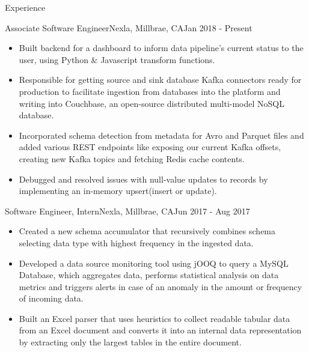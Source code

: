\documentclass[]{dhruv_misra}
\begin{document}
	\makeheader
	
	
	\begin{cvsection}{Experience}
        \begin{cvsubsection}{Associate Software Engineer}{Nexla, Millbrae, CA}{Jan 2018 - Present}
			\begin{itemize}
				\item Built backend for a dashboard to inform data pipeline's current status to the user, using Python \& Javascript transform functions.
				\item Responsible for getting source and sink database Kafka connectors ready for production to facilitate ingestion from databases into the platform and writing into Couchbase, an open-source distributed multi-model NoSQL database.
				\item Incorporated schema detection from metadata for Avro and Parquet files and added various REST endpoints like exposing our current Kafka offsets, creating new Kafka topics and fetching Redis cache contents.
				\item Debugged and resolved issues with null-value updates to records by implementing an in-memory upsert(insert or update).
			\end{itemize}
	    \end{cvsubsection}
	    
        \begin{cvsubsection}{Software Engineer, Intern}{Nexla, Millbrae, CA}{Jun 2017 - Aug 2017}
			\begin{itemize}
				\item Created a new schema accumulator that recursively combines schema selecting data type with highest frequency in the ingested data. 
				\item Developed a data source monitoring tool using jOOQ to query a MySQL Database, which aggregates data, performs statistical analysis on data metrics and triggers alerts in case of an anomaly in the amount or frequency of incoming data.
				\item Built an Excel parser that uses heuristics to collect readable tabular data from an Excel document and converts it into an internal data representation by extracting only the largest tables in the entire document.
			\end{itemize}
	    \end{cvsubsection}
	    

\end{cvsection}
\end{document}
